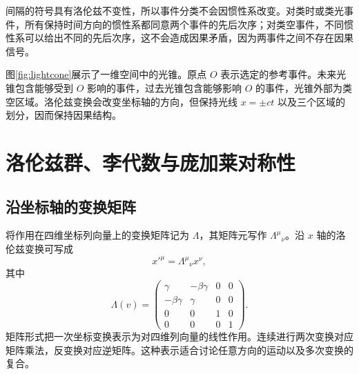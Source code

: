 \documentclass[style=classic,color=full]{lc-article}
\begin{document}
间隔的符号具有洛伦兹不变性，所以事件分类不会因惯性系改变。对类时或类光事件，所有保持时间方向的惯性系都同意两个事件的先后次序；对类空事件，不同惯性系可以给出不同的先后次序，这不会造成因果矛盾，因为两事件之间不存在因果信号。

图\ref{fig:lightcone}展示了一维空间中的光锥。原点 $O$ 表示选定的参考事件。未来光锥包含能够受到 $O$ 影响的事件，过去光锥包含能够影响 $O$ 的事件，光锥外部为类空区域。洛伦兹变换会改变坐标轴的方向，但保持光线 $x=\pm ct$ 以及三个区域的划分，因而保持因果结构。


\clearpage
\section{洛伦兹群、李代数与庞加莱对称性}

\subsection{沿坐标轴的变换矩阵}

将作用在四维坐标列向量上的变换矩阵记为 $\Lambda$，其矩阵元写作 ${\Lambda^\mu}_{\nu}$。沿 $x$ 轴的洛伦兹变换可写成
\begin{equation}
  x'^\mu={\Lambda^\mu}_{\nu}x^\nu,
\end{equation}
其中
\begin{equation}
  \Lambda(v)=
  \begin{pmatrix}
    \gamma&-\beta\gamma&0&0\\
    -\beta\gamma&\gamma&0&0\\
    0&0&1&0\\
    0&0&0&1
  \end{pmatrix}.
  \label{eq:boostmatrix}
\end{equation}
矩阵形式把一次坐标变换表示为对四维列向量的线性作用。连续进行两次变换对应矩阵乘法，反变换对应逆矩阵。这种表示适合讨论任意方向的运动以及多次变换的复合。
\end{document}
